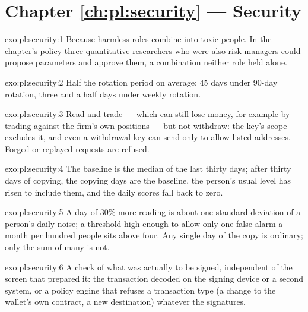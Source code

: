 \section*{Chapter \ref{ch:pl:security} --- Security}

\begin{solution}{exo:pl:security:1}
Because harmless roles combine into toxic people. In the chapter's policy three quantitative researchers who were also risk managers could
propose parameters and approve them, a combination neither role held alone.
\end{solution}

\begin{solution}{exo:pl:security:2}
Half the rotation period on average: 45 days under 90-day rotation, three and a half days under weekly rotation.
\end{solution}

\begin{solution}{exo:pl:security:3}
Read and trade --- which can still lose money, for example by trading against the firm's own positions --- but not withdraw: the key's scope
excludes it, and even a withdrawal key can send only to allow-listed addresses. Forged or replayed requests are refused.
\end{solution}

\begin{solution}{exo:pl:security:4}
The baseline is the median of the last thirty days; after thirty days of copying, the copying days are the baseline, the person's usual level
has risen to include them, and the daily scores fall back to zero.
\end{solution}

\begin{solution}{exo:pl:security:5}
A day of 30\% more reading is about one standard deviation of a person's daily noise; a threshold high enough to allow only one false alarm a
month per hundred people sits above four. Any single day of the copy is ordinary; only the sum of many is not.
\end{solution}

\begin{solution}{exo:pl:security:6}
A check of what was actually to be signed, independent of the screen that prepared it: the transaction decoded on the signing device or a second
system, or a policy engine that refuses a transaction type (a change to the wallet's own contract, a new destination) whatever the signatures.
\end{solution}

